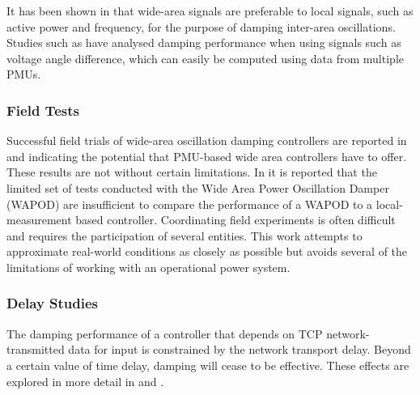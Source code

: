 \documentclass{ieeeaccess}
\begin{document}
It has been shown in \cite{Yuwa} that wide-area signals are preferable to local signals, such as active power and frequency, \cite{localREMcomparison} for the purpose of damping inter-area oscillations. Studies such as \cite{Yuwa} have analysed damping performance when using signals such as voltage angle difference, which can easily be computed using data from multiple PMUs.

\subsubsection{Field Tests}
Successful field trials of wide-area oscillation damping controllers are reported in \cite{WAPODNorway} and \cite{WAPODChina} indicating the potential that PMU-based wide area controllers have to offer. These results are not without certain limitations. In \cite{WAPODNorway} it is reported that the limited set of tests conducted with the Wide Area Power Oscillation Damper (WAPOD) are insufficient to compare the performance of a WAPOD to a local-measurement based controller. Coordinating field experiments is often difficult and requires the participation of several entities. This work attempts to approximate real-world conditions as closely as possible but avoids several of the limitations of working with an operational power system.

\subsubsection{Delay Studies} The damping performance of a controller that depends on TCP network-transmitted data for input is constrained by the network transport delay. Beyond a certain value of time delay, damping will cease to be effective. These effects are explored in more detail in \cite{China_paper} and \cite{Biplab}.
\end{document}
